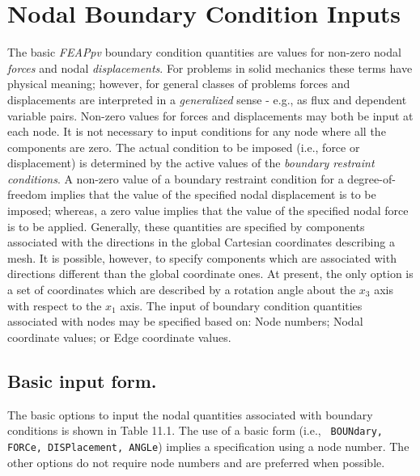 \section{Nodal Boundary Condition Inputs}
\label{bc}

The basic {\sl FEAPpv} boundary condition quantities
are values for non-zero nodal {\it forces} and nodal {\it displacements}.
For problems in solid mechanics these terms have physical meaning; however,
for general classes of problems forces and displacements are interpreted
in a {\it generalized} sense - e.g., as flux and dependent variable pairs.
Non-zero values for forces and displacements may both be input
at each node.  It is not necessary to input conditions for
any node where all the components are zero.  The actual condition
to be imposed (i.e., force or displacement)
is determined by the active values of the {\it boundary
restraint conditions}.  A non-zero value of a boundary restraint
condition for a degree-of-freedom implies that the value of the
specified nodal displacement is to be imposed; whereas, a zero
value implies that the value of the specified nodal force is to be
applied.  Generally,
these quantities are specified by components associated with the
directions in the global Cartesian coordinates describing a mesh.
It is possible, however, to specify components
which are associated with directions different than the global coordinate ones.
At present, the only option is a set of coordinates which are described
by a rotation angle about the $x_3$ axis with respect to the $x_1$ axis.
The input of boundary condition quantities associated with nodes may
be specified based on: Node numbers; Nodal coordinate values; or
Edge coordinate values.

\subsection{Basic input form.}

The basic options to input the nodal quantities associated with boundary
conditions is shown in Table 11.1.  The use of a basic form (i.e., {\tt
BOUNdary, FORCe, DISPlacement, ANGLe}) implies a specification using
a node number.  The other options do not require node numbers and are
preferred when possible.

